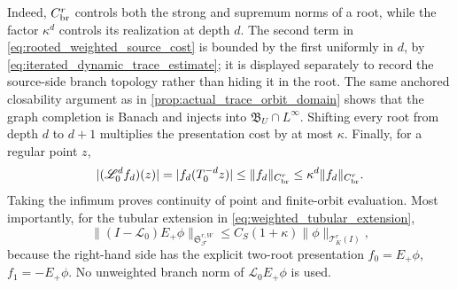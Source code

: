 \documentclass[11pt]{amsart}
\theoremstyle{compactplain}
\theoremstyle{compactdefinition}
\theoremstyle{compactremark}
\newcommand{\Ltransfer}{\mathscr L}
\begin{document}
Indeed, \(C_{\rm br}^r\) controls both the strong and supremum norms of a
root, while the factor \(\kappa^d\) controls its realization at depth \(d\).
The second term in \eqref{eq:rooted_weighted_source_cost} is bounded by the
first uniformly in \(d\), by
\eqref{eq:iterated_dynamic_trace_estimate}; it is displayed separately to
record the source-side branch topology rather than hiding it in the root.
The same anchored closability argument as in
\cref{prop:actual_trace_orbit_domain} shows that the graph completion is
Banach and injects into \(\mathfrak B_U\cap L^\infty\).  Shifting every root from depth \(d\) to
\(d+1\) multiplies the presentation cost by at most \(\kappa\).  Finally,
for a regular point \(z\),
\[
 |(\Ltransfer_0^df_d)(z)|
 =|f_d(T_0^{-d}z)|
 \le\|f_d\|_{C_{\rm br}^r}
 \le\kappa^d\|f_d\|_{C_{\rm br}^r}.
\]
Taking the infimum proves continuity of point and finite-orbit evaluation.
Most importantly, for the tubular extension in
\eqref{eq:weighted_tubular_extension},
\begin{equation}
\label{eq:weighted_source_two_root_bound}
 \|(I-\Ltransfer_0)E_+\phi\|_{
       \mathfrak S_{\mathscr F}^{r,W}}
 \le C_S(1+\kappa)\|\phi\|_{\mathcal T_K^r(I)},
\end{equation}
because the right-hand side has the explicit two-root presentation
\(f_0=E_+\phi\), \(f_1=-E_+\phi\).  No unweighted branch norm of
\(\Ltransfer_0E_+\phi\) is used.
\end{document}
